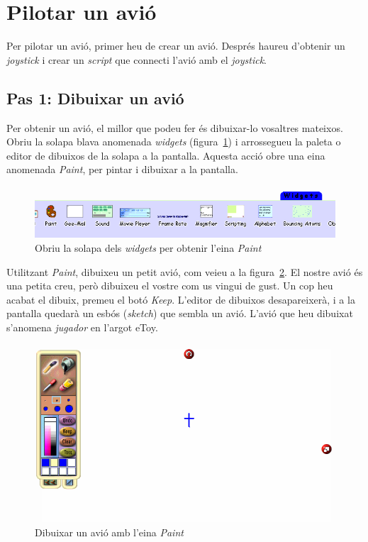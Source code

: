 \section{Pilotar un avió}
Per pilotar un avió, primer heu de crear un avió. Després haureu d'obtenir un \emph{joystick} i crear un \emph{script} que connecti l'avió amb el \emph{joystick}.

\subsection{Pas 1: Dibuixar un avió}
Per obtenir un avió, el millor que podeu fer és dibuixar-lo vosaltres mateixos. Obriu la solapa blava anomenada \emph{widgets} (figura~\ref{fig2401}) i arrossegueu la paleta o editor de dibuixos de la solapa a la pantalla. Aquesta acció obre una eina anomenada \emph{Paint}, per pintar i dibuixar a la pantalla. 
\begin{figure}[h!]
\begin{center}
\includegraphics[scale=0.65]{Imatges/figura24-1}
\end{center}
\caption{Obriu la solapa dels \emph{widgets} per obtenir l'eina \emph{Paint}}
\label{fig2401}
\end{figure}

Utilitzant \emph{Paint}, dibuixeu un petit avió, com veieu a la figura~\ref{fig2402}. El nostre avió és una petita creu, però dibuixeu el vostre com us vingui de gust. Un cop heu acabat el dibuix, premeu el botó \emph{Keep}. L'editor de dibuixos desapareixerà, i a la pantalla quedarà un esbós (\emph{sketch}) que sembla un avió. L'avió que heu dibuixat s'anomena \emph{jugador} en l'argot eToy. 
\begin{figure}[h!]
\begin{center}
\includegraphics[scale=0.5]{Imatges/figura24-2}
\end{center}
\caption{Dibuixar un avió amb l'eina \emph{Paint}}
\label{fig2402}
\end{figure}

